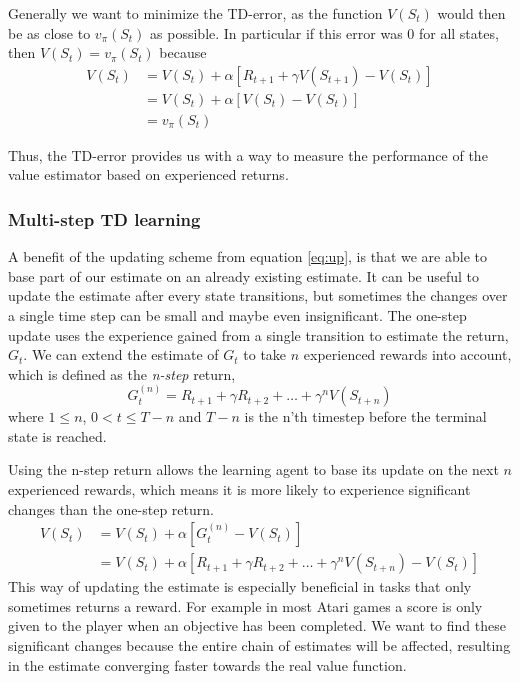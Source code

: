 \documentclass[11pt]{article}
\begin{document}
Generally we want to minimize the TD-error, as the function $V(S_t)$
would then be as close to $v_\pi(S_t)$ as possible.
In particular if this error was 0 for all states, then
$V(S_t) = v_\pi(S_t)$ because 
\begin{equation}
    \begin{aligned}
    V(S_t)  & = V(S_t) + \alpha  [R_{t+1} + \gamma  V(S_{t+1}) - V(S_t)]   \\
           & = V(S_t) + \alpha  [V(S_t) - V(S_t)]  \\
           & = v_\pi(S_t) 
    \end{aligned}
\end{equation}

Thus, the TD-error provides us with a way to measure the performance of
the value estimator based on experienced returns.

\subsubsection{Multi-step TD learning}\label{sec:multi}

A benefit of the updating scheme from equation \ref{eq:up}, is that we are able to base
part of our estimate on an already existing estimate.
It can be useful to update the estimate after every state transitions, but sometimes
the changes over a single time step can be small and maybe even insignificant.
The one-step update uses the experience gained from a single transition to
estimate the return, $G_t$.
We can extend the estimate of $G_t$ to take $n$ experienced rewards
into account, which is defined as the \textit{n-step} return,
\begin{equation}
    G^{(n)}_t = R_{t+1} + \gamma R_{t+2} + \dots + \gamma^n V(S_{t+n})
\end{equation}
where $1 \leq n$, $0 < t \leq T - n$ and $T - n$ is the n'th timestep before the terminal state
is reached.

Using the n-step return allows the learning agent to base its update on the next $n$ experienced
rewards, which means it is more likely to experience significant changes than the one-step return.
\begin{equation}
    \begin{aligned}    
        V(S_t) & = V(S_t) + \alpha [G^{(n)}_t - V(S_t)]\\
        & = V(S_t) + \alpha [R_{t+1} + \gamma R_{t+2} + \dots + \gamma^n V(S_{t+n}) - V(S_t)]
    \end{aligned}
\end{equation}
This way of updating the estimate is especially beneficial in tasks that only sometimes returns a reward. 
For example in most Atari games a score is only given to the player when an objective has been completed.
We want to find these significant changes because the entire chain of estimates 
will be affected, resulting in the estimate converging faster towards the real value function.
\end{document}
